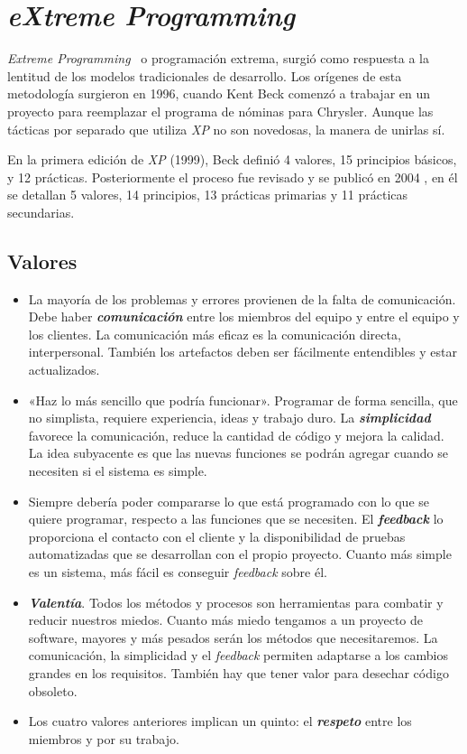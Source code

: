 \section{\textit{eXtreme Programming}}
\textit{Extreme Programming}~\cite{Ubeda}  o programación extrema, surgió como respuesta a la lentitud de los modelos tradicionales de desarrollo. Los orígenes de esta metodología surgieron en 1996, cuando Kent Beck comenzó a trabajar en un proyecto para reemplazar el programa de nóminas para Chrysler. Aunque las tácticas por separado que utiliza \textit{XP} no son novedosas, la manera de unirlas sí. 

En la primera edición de \textit{XP} (1999), Beck definió 4 valores, 15 principios básicos, y 12 prácticas. Posteriormente el proceso fue revisado y se publicó en 2004 \cite{Beck:2004:EPE:1076267}, en él se detallan 5 valores, 14 principios, 13 prácticas primarias y 11 prácticas secundarias.

\subsection{Valores}
\begin{itemize}
\item La mayoría de los problemas y errores provienen de la falta de comunicación. Debe haber \textbf{\textit{comunicación}} entre los miembros del equipo y entre el equipo y los clientes. La comunicación más eficaz es la comunicación directa, interpersonal. También los artefactos deben ser fácilmente entendibles y estar actualizados.

\item «Haz lo más sencillo que podría funcionar». Programar de forma sencilla, que no simplista, requiere experiencia, ideas y trabajo duro. La \textbf{\textit{simplicidad}} favorece la comunicación, reduce la cantidad de código y mejora la calidad. La idea subyacente es que las nuevas funciones se podrán agregar cuando se necesiten si el sistema es simple.

\item Siempre debería poder compararse lo que está programado con lo que se quiere programar, respecto a las funciones que se necesiten. El \textbf{\textit{feedback}} lo proporciona el contacto con el cliente y la disponibilidad de pruebas automatizadas que se desarrollan con el propio proyecto. Cuanto más simple es un sistema, más fácil es conseguir \textit{feedback} sobre él. 

\item \textbf{\textit{Valentía}}. Todos los métodos y procesos son herramientas para combatir y reducir nuestros miedos. Cuanto más miedo tengamos a un proyecto de software, mayores y más pesados serán los métodos que necesitaremos. La comunicación, la simplicidad y el \textit{feedback} permiten adaptarse a los cambios grandes en los requisitos. También hay que tener valor para desechar código obsoleto.

\item Los cuatro valores anteriores implican un quinto: el \textbf{\textit{respeto}} entre los miembros y por su trabajo.
\end{itemize}

